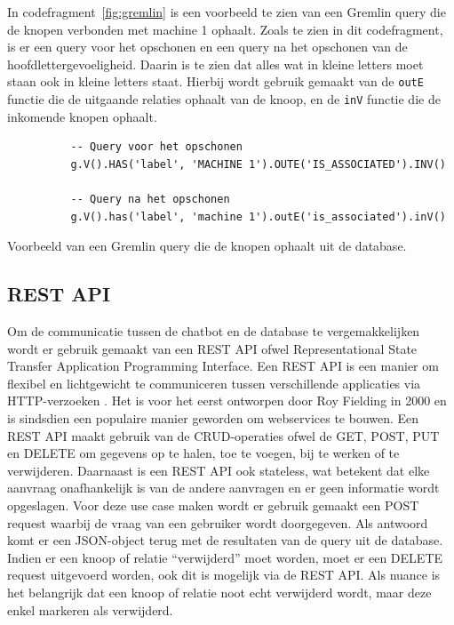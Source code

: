 In codefragment~\ref{fig:gremlin} is een voorbeeld te zien van een Gremlin query die de knopen verbonden met machine 1 ophaalt.
Zoals te zien in dit codefragment, is er een query voor het opschonen en een query na het opschonen van de hoofdlettergevoeligheid. 
Daarin is te zien dat alles wat in kleine letters moet staan ook in kleine letters staat.
Hierbij wordt gebruik gemaakt van de \texttt{outE} functie die de uitgaande relaties ophaalt van de knoop, en de \texttt{inV} functie die de inkomende knopen ophaalt.

\begin{listing} [H]
     \begin{verbatim}
          -- Query voor het opschonen
          g.V().HAS('label', 'MACHINE 1').OUTE('IS_ASSOCIATED').INV()

          -- Query na het opschonen
          g.V().has('label', 'machine 1').outE('is_associated').inV()
     \end{verbatim}
     \caption[Voorbeeld Gremlin query]{\label{fig:gremlin}Voorbeeld van een Gremlin query die de knopen ophaalt uit de database.}
\end{listing}

\subsection{REST API}{\label{sec:restapi}}
Om de communicatie tussen de chatbot en de database te vergemakkelijken wordt er gebruik gemaakt van een REST API ofwel Representational State Transfer Application Programming Interface.
Een REST API is een manier om flexibel en lichtgewicht te communiceren tussen verschillende applicaties via HTTP-verzoeken \autocite{RESTAPI2021}.
Het is voor het eerst ontworpen door Roy Fielding in 2000 en is sindsdien een populaire manier geworden om webservices te bouwen.
Een REST API maakt gebruik van de CRUD-operaties ofwel de GET, POST, PUT en DELETE om gegevens op te halen, toe te voegen, bij te werken of te verwijderen.
Daarnaast is een REST API ook stateless, wat betekent dat elke aanvraag onafhankelijk is van de andere aanvragen en er geen informatie wordt opgeslagen.
Voor deze use case maken wordt er gebruik gemaakt een POST request waarbij de vraag van een gebruiker wordt doorgegeven.
Als antwoord komt er een JSON-object terug met de resultaten van de query uit de database.
Indien er een knoop of relatie ``verwijderd'' moet worden, moet er een DELETE request uitgevoerd worden, ook dit is mogelijk via de REST API.\@
Als nuance is het belangrijk dat een knoop of relatie noot echt verwijderd wordt, maar deze enkel markeren als verwijderd.

